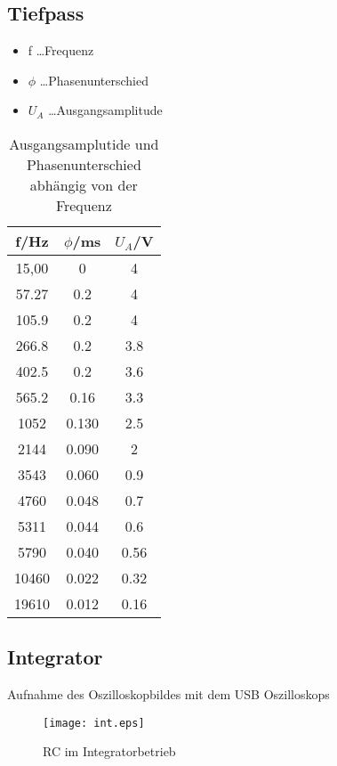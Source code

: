\documentclass[a4paper]{article}
\begin{document}
\subsection{Tiefpass}
\begin{table}[ht]
  \centering
  \caption{Ausgangsamplutide und Phasenunterschied abhängig von der Frequenz}
  \begin{itemize}
    \item f \dots Frequenz
    \item $\phi$ \dots Phasenunterschied
    \item $U_A$ \dots Ausgangsamplitude
  \end{itemize}
  \begin{tabular}{|c|c|c|}
    \hline
    f/Hz&$\phi$/ms&$U_A$/V\\
    \hline
    15,00&0&4\\
    \hline
    57.27&0.2&4\\
    \hline
    105.9&0.2&4\\
    \hline
    266.8&0.2&3.8\\
    \hline
    402.5&0.2&3.6\\
    \hline
    565.2&0.16&3.3\\
    \hline
    1052&0.130&2.5\\
    \hline
    2144&0.090&2\\
    \hline
    3543&0.060&0.9\\
    \hline
    4760&0.048&0.7\\
    \hline
    5311&0.044&0.6\\
    \hline
    5790&0.040&0.56\\
    \hline
    10460&0.022&0.32\\
    \hline
    19610&0.012&0.16\\
    \hline
  \end{tabular}
  \label{tab:2}
\end{table}



\newpage
\subsection{Integrator}

Aufnahme des Oszilloskopbildes mit dem USB Oszilloskops
\begin{figure}[ht]
\begin{center}
  \texttt{[image: int.eps]}
\end{center}
\caption{RC im Integratorbetrieb}
\label{fig:5}
\end{figure}
\end{document}
